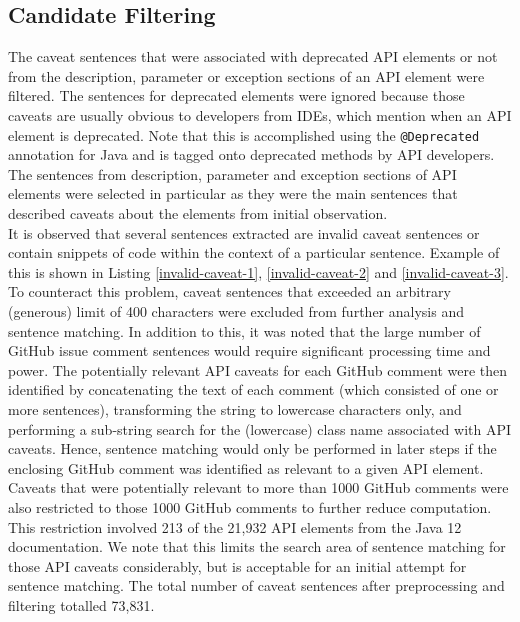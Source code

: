\subsection{Candidate Filtering}
\label{subsec:info-candidate-filtering}
The caveat sentences that were associated with deprecated API elements or not from the description, parameter or exception sections of an API element were filtered. The sentences for deprecated elements were ignored because those caveats are usually obvious to developers from IDEs, which mention when an API element is deprecated. Note that this is accomplished using the \lstinline{@Deprecated} annotation for Java and is tagged onto deprecated methods by API developers. The sentences from description, parameter and exception sections of API elements were selected in particular as they were the main sentences that described caveats about the elements from initial observation. \\

It is observed that several sentences extracted are invalid caveat sentences or contain snippets of code within the context of a particular sentence. Example of this is shown in Listing \ref{invalid-caveat-1}, \ref{invalid-caveat-2} and \ref{invalid-caveat-3}. To counteract this problem, caveat sentences that exceeded an arbitrary (generous) limit of 400 characters were excluded from further analysis and sentence matching. In addition to this, it was noted that the large number of GitHub issue comment sentences would require significant processing time and power. The potentially relevant API caveats for each GitHub comment were then identified by concatenating the text of each comment (which consisted of one or more sentences), transforming the string to lowercase characters only, and performing a sub-string search for the (lowercase) class name associated with API caveats. Hence, sentence matching would only be performed in later steps if the enclosing GitHub comment was identified as relevant to a given API element. Caveats that were potentially relevant to more than 1000 GitHub comments were also restricted to those 1000 GitHub comments to further reduce computation. This restriction involved 213 of the 21,932 API elements from the Java 12 documentation. We note that this limits the search area of sentence matching for those API caveats considerably, but is acceptable for an initial attempt for sentence matching. The total number of caveat sentences after preprocessing and filtering totalled 73,831.\\

